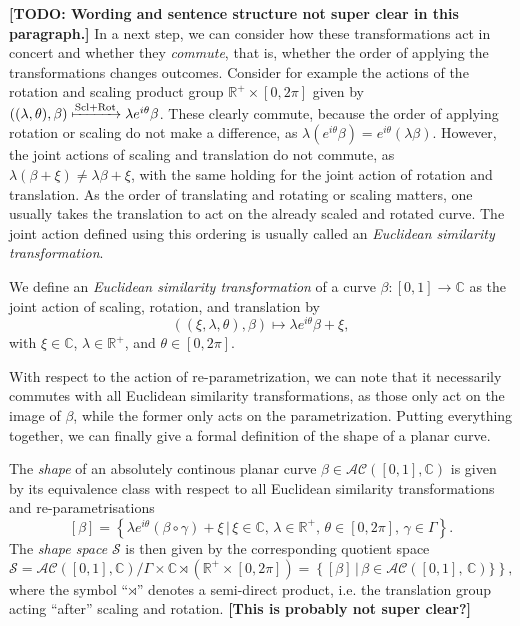 \textbf{[TODO: Wording and sentence structure not super clear in this paragraph.]}
In a next step, we can consider how these transformations act in concert and whether they \textit{commute}, that is, whether the order of applying the transformations changes outcomes.
Consider for example the actions of the rotation and scaling product group $\mathbb{R}^+ \times [0,2\pi]$ given by $((\lambda, \theta), \beta) \xmapsto{\text{Scl} + \text{Rot}} \lambda e^{i\theta} \beta$.
These clearly commute, because the order of applying rotation or scaling do not make a difference, as $\lambda(e^{i\theta}\beta) = e^{i\theta}(\lambda\beta)$.
However, the joint actions of scaling and translation do not commute, as $\lambda(\beta + \xi) \neq \lambda\beta + \xi$, with the same holding for the joint action of rotation and translation.
As the order of translating and rotating or scaling matters, one usually takes the translation to act on the already scaled and rotated curve.
The joint action defined using this ordering is usually called an \textit{Euclidean similarity transformation}.

\begin{definition} 
  We define an \emph{Euclidean similarity transformation} of a curve $\beta : [0,1] \rightarrow \mathbb{C}$ as the joint action of scaling, rotation, and translation by
  $$((\xi, \lambda, \theta), \beta) \mapsto \lambda e^{i\theta} \beta + \xi,$$
  with $\xi \in \mathbb{C}$, $\lambda \in \mathbb{R}^+$, and $\theta \in [0,2\pi]$.
\end{definition}

\noindent With respect to the action of re-parametrization, we can note that it necessarily commutes with all Euclidean similarity transformations, as those only act on the image of $\beta$, while the former only acts on the parametrization.
Putting everything together, we can finally give a formal definition of the shape of a planar curve.

\begin{definition}[Shape]
  The \emph{shape} of an absolutely continous planar curve $\beta \in \mathcal{AC}([0,1], \mathbb{C})$ is given by its equivalence class with respect to all Euclidean similarity transformations and re-parametrisations
  $$ [\beta] = \left\{\lambda e^{i\theta}(\beta \circ \gamma) + \xi\,|\, \xi \in \mathbb{C},\, \lambda \in \mathbb{R}^+,\, \theta \in [0,2\pi],\, \gamma \in \Gamma\right\}. $$
  The \emph{shape space} $\mathcal{S}$ is then given by the corresponding quotient space 
  $$\mathcal{S} = \mathcal{AC}([0,1], \mathbb{C}) \big/ \Gamma \times \mathbb{C} \rtimes \left( \mathbb{R}^+ \times [0,2\pi] \right) = \left\{[\beta]\,|\,\beta \in \mathcal{AC}([0,1],\, \mathbb{C})\}\right\},$$
  where the symbol \enquote{$\rtimes$} denotes a semi-direct product, i.e. the translation group acting \enquote{after} scaling and rotation. 
  \textbf{[This is probably not super clear?]}
\end{definition}


